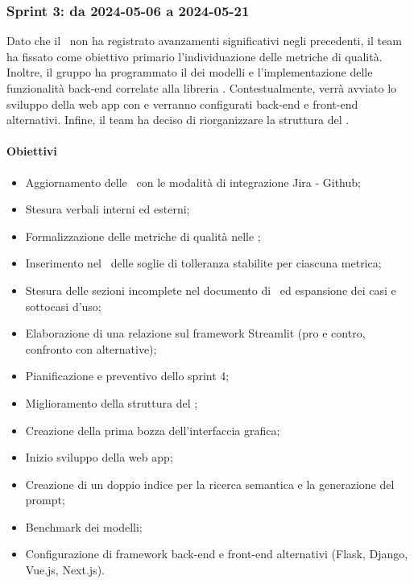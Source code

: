 \subsubsection{Sprint 3: da 2024-05-06 a 2024-05-21}
\par Dato che il \PdQ\ non ha registrato avanzamenti significativi negli  precedenti, il team ha fissato come obiettivo primario l'individuazione delle metriche di qualità. Inoltre, il gruppo ha programmato il  dei modelli e l'implementazione delle funzionalità back-end correlate alla libreria . Contestualmente, verrà avviato lo sviluppo della web app con  e verranno configurati  back-end e front-end alternativi. Infine, il team ha deciso di riorganizzare la struttura del \PdP.

\paragraph{Obiettivi}
\begin{itemize}
  \item Aggiornamento delle \NdP\ con le modalità di integrazione Jira - Github;
  \item Stesura verbali interni ed esterni;
  \item Formalizzazione delle metriche di qualità nelle \NdP;
  \item Inserimento nel \PdQ\ delle soglie di tolleranza stabilite per ciascuna metrica;
  \item Stesura delle sezioni incomplete nel documento di \AdR\ ed espansione dei casi e sottocasi d'uso;
  \item Elaborazione di una relazione sul framework Streamlit (pro e contro, confronto con alternative);
  \item Pianificazione e preventivo dello sprint 4;
  \item Miglioramento della struttura del \PdP;
  \item Creazione della prima bozza dell'interfaccia grafica;
  \item Inizio sviluppo della web app;
  \item Creazione di un doppio indice per la ricerca semantica e la generazione del prompt;
  \item Benchmark dei modelli;
  \item Configurazione di framework back-end e front-end alternativi (Flask, Django, Vue.js, Next.js).
\end{itemize}

\vspace{0.5\baselineskip}
\par [Inserire Gantt]